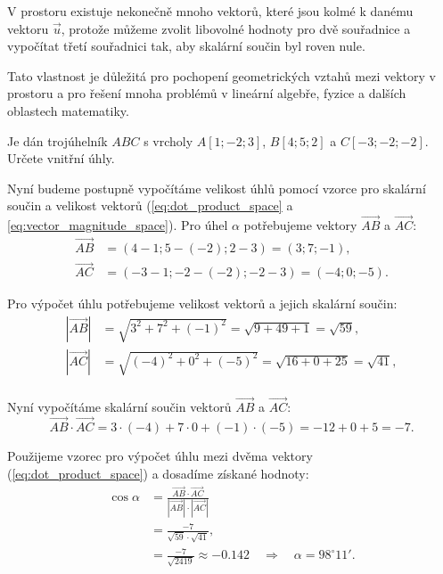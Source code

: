 \begin{remark}
    V prostoru existuje nekonečně mnoho vektorů, 
    které jsou kolmé k danému vektoru $\vec{u}$, 
    protože můžeme zvolit libovolné hodnoty pro dvě souřadnice a vypočítat třetí souřadnici tak, 
    aby skalární součin byl roven nule.

    Tato vlastnost je důležitá pro pochopení geometrických vztahů mezi vektory v prostoru a pro řešení mnoha problémů v lineární algebře,
    fyzice a dalších oblastech matematiky.
\end{remark}

\begin{example}
    Je dán trojúhelník $ABC$ s vrcholy $A[1; -2; 3]$, $B[4; 5; 2]$ a $C[-3; -2; -2]$. Určete vnitřní úhly.

    Nyní budeme postupně vypočítáme velikost úhlů pomocí vzorce pro skalární součin a velikost vektorů (\ref{eq:dot_product_space} a \ref{eq:vector_magnitude_space}).
    Pro úhel $\alpha$ potřebujeme vektory $\overrightarrow{AB}$ a $\overrightarrow{AC}$:
    \begin{align*}
        \overrightarrow{AB} &= (4 - 1; 5 - (-2); 2 - 3) = (3; 7; -1),\\
        \overrightarrow{AC} &= (-3 - 1; -2 - (-2); -2 - 3) = (-4; 0; -5).
    \end{align*}

    Pro výpočet úhlu potřebujeme velikost vektorů a jejich skalární součin:
    \begin{align*}
        |\overrightarrow{AB}| &= \sqrt{3^2 + 7^2 + (-1)^2} = \sqrt{9 + 49 + 1} = \sqrt{59},\\
        |\overrightarrow{AC}| &= \sqrt{(-4)^2 + 0^2 + (-5)^2} = \sqrt{16 + 0 + 25} = \sqrt{41},\\
    \end{align*}
    
    Nyní vypočítáme skalární součin vektorů $\overrightarrow{AB}$ a $\overrightarrow{AC}$:
    \[
        \overrightarrow{AB} \cdot \overrightarrow{AC} = 3 \cdot (-4) + 7 \cdot 0 + (-1) \cdot (-5) = -12 + 0 + 5 = -7.
    \]

    Použijeme vzorec pro výpočet úhlu mezi dvěma vektory (\ref{eq:dot_product_space}) a dosadíme získané hodnoty:
    \begin{align*}
        \cos \alpha &= \frac{\overrightarrow{AB} \cdot \overrightarrow{AC}}{|\overrightarrow{AB}| \cdot |\overrightarrow{AC}|} \\
                    &= \frac{-7}{\sqrt{59} \cdot \sqrt{41}}, \\ 
                    &= \frac{-7}{\sqrt{2419}} \approx -0.142 \quad \Rightarrow \quad \alpha = 98^\circ 11'.
    \end{align*}


\end{example}
